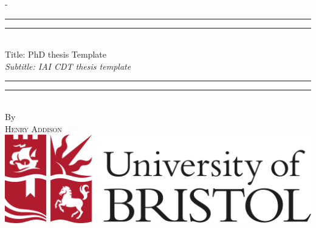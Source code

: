 %
%
%
%
%
\begin{titlingpage}
\begin{SingleSpace}
\calccentering{\unitlength}
\begin{adjustwidth*}{\unitlength}{-\unitlength}
\vspace*{13mm}
\begin{center}
\rule[0.5ex]{\linewidth}{2pt}\vspace*{-\baselineskip}\vspace*{3.2pt}
\rule[0.5ex]{\linewidth}{1pt}\\[\baselineskip]
{\HUGE  Title: PhD thesis Template }\\[4mm]
{\Large \textit{Subtitle: IAI CDT thesis template}}\\
\rule[0.5ex]{\linewidth}{1pt}\vspace*{-\baselineskip}\vspace{3.2pt}
\rule[0.5ex]{\linewidth}{2pt}\\
\vspace{6.5mm}
{\large By}\\
\vspace{6.5mm}
{\large\textsc{Henry Addison}}\\
\vspace{10mm}
\includegraphics[scale=0.2]{logos/UoB_RGB_24.png}
\\



\end{center}
\end{adjustwidth*}
\end{SingleSpace}
\end{titlingpage}
